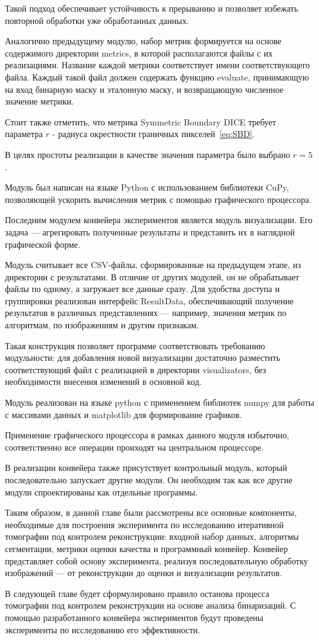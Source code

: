 Такой подход обеспечивает устойчивость к прерыванию и позволяет избежать повторной обработки уже обработанных данных.

Аналогично предыдущему модулю, набор метрик формируется на основе содержимого директории metrics, в которой располагаются файлы с их реализациями. Название каждой метрики соответствует имени соответствующего файла. Каждый такой файл должен содержать функцию evaluate, принимающую на вход бинарную маску и эталонную маску, и возвращающую численное значение метрики.

Стоит также отметить, что метрика Symmetric Boundary DICE требует параметра \(r\) - радиуса окрестности граничных пикселей~\eqref{eq:SBD}.

В целях простоты реализации в качестве значения параметра было выбрано \(r = 5\). 

Модуль был написан на языке Python с использованием библиотеки CuPy, позволяющей ускорить вычисления метрик с помощью графического процессора.

Последним модулем конвейера экспериментов является модуль визуализации. Его задача — агрегировать полученные результаты и представить их в наглядной графической форме.

Модуль считывает все CSV-файлы, сформированные на предыдущем этапе, из директории с результатами. В отличие от других модулей, он не обрабатывает файлы по одному, а загружает все данные сразу. Для удобства доступа и группировки реализован интерфейс ResultData, обеспечивающий получение результатов в различных представлениях — например, значения метрик по алгоритмам, по изображениям и другим признакам.

Такая конструкция позволяет программе соответствовать требованию модульности: для добавления новой визуализации достаточно разместить соответствующий файл с реализацией в директории visualizators, без необходимости внесения изменений в основной код.

Модуль реализован на языке python с применением библиотек numpy для работы с массивами данных и matplotlib для формирование графиков.

Применение графического процессора в рамках данного модуля избыточно, соответственно все операции проиходят на центральном процессоре.

В реализации конвейера также присутствует контрольный модуль, который последовательно запускает другие модули. Он необходим так как все другие модули спроектированы как отдельные программы.

Таким образом, в данной главе были рассмотрены все основные компоненты, необходимые для построения эксперимента по исследованию итеративной томографии под контролем реконструкции: входной набор данных, алгоритмы сегментации, метрики оценки качества и программный конвейер. Конвейер представляет собой основу эксперимента, реализуя последовательную обработку изображений — от реконструкции до оценки и визуализации результатов. 

В следующей главе будет сформулировано правило останова процесса томографии под контролем реконструкции на основе анализа бинаризаций. С помощью разработанного конвейера экспериментов будут проведены эксперименты по исследованию его эффективности.